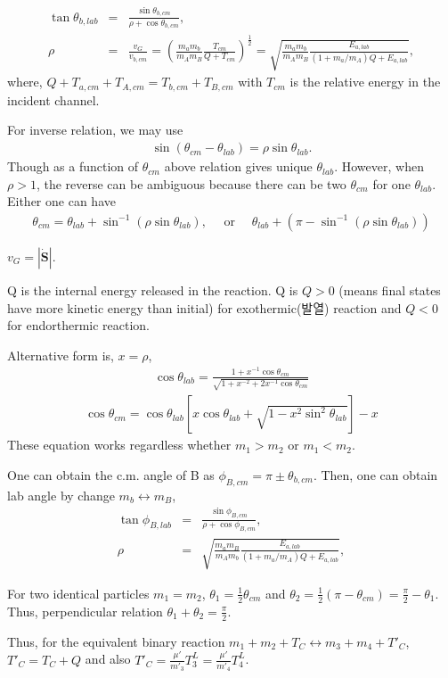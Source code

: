 \documentclass[10pt]{book}
\def\bm{\boldsymbol}
\newcommand{\bea}{\begin{eqnarray}}
\newcommand{\eea}{\end{eqnarray}}
\newcommand{\no}{\nonumber \\}
\begin{document}
\begin{itemize}
{	
}
  
\bea
\tan\theta_{b,lab}&=&\frac{\sin\theta_{b,cm}}{\rho+\cos\theta_{b,cm}},\no
\rho&=&\frac{v_G}{v_{b,cm}}=\left(\frac{m_a m_b}{m_A m_B}\frac{T_{cm}}{Q+T_{cm}}\right)^{\frac{1}{2}}
  = \sqrt{\frac{m_a m_b}{m_A m_B}\frac{E_{a,lab}}{(1+m_a/m_A)Q+E_{a,lab} }},
\eea
where, $Q+T_{a,cm}+T_{A,cm}=T_{b,cm}+T_{B,cm}$ 
with $T_{cm}$ is the relative energy in the incident channel.

For inverse relation, we may use 
\bea 
\sin(\theta_{cm}-\theta_{lab})=\rho\sin\theta_{lab}.
\eea 
Though as a function of $\theta_{cm}$ above relation gives unique $\theta_{lab}$. 
However, when $\rho> 1$, the reverse can be ambiguous
because there can be two $\theta_{cm}$ for one $\theta_{lab}$.   
Either one can have 
\bea 
\theta_{cm} = \theta_{lab}+\sin^{-1}(\rho \sin\theta_{lab}), \quad \mbox{ or } \quad 
              \theta_{lab}+(\pi-\sin^{-1}(\rho \sin\theta_{lab}))
\eea 


$v_G=|\dot{\bm S}|$.


Q is the internal energy released in the reaction.
Q is $Q>0$
(means final states have more kinetic energy than initial) 
for exothermic(발열) reaction and
$Q<0$ for endorthermic reaction.


Alternative form is, $x=\rho$,
\bea 
\cos\theta_{lab} = \frac{1+x^{-1}\cos\theta_{cm}}{\sqrt{1+x^{-2}+2 x^{-1}\cos\theta_{cm}}}
\eea  
\bea 
\cos\theta_{cm} =\cos\theta_{lab}\left[ x\cos\theta_{lab}+\sqrt{1-x^2\sin^2\theta_{lab}}\right] -x  
\eea 
These equation works regardless whether $m_1 > m_2$ or $m_1 < m_2$. 

One can obtain the c.m. angle of B as $\phi_{B,cm}=\pi\pm \theta_{b,cm}$.
Then, one can obtain lab angle by change $m_b\leftrightarrow m_B$,
\bea 
\tan\phi_{B,lab}&=&\frac{\sin\phi_{B,cm}}{\rho+\cos\phi_{B,cm}},\no
\rho&=&\sqrt{\frac{m_a m_B}{m_A m_b}\frac{E_{a,lab}}{(1+m_a/m_A)Q+E_{a,lab} }},
\eea 

For two identical particles $m_1=m_2$, 
$\theta_1=\frac{1}{2}\theta_{cm}$ and $\theta_2=\frac{1}{2}(\pi-\theta_{cm})=\frac{\pi}{2}-\theta_1$. 
Thus, perpendicular relation $\theta_1+\theta_2=\frac{\pi}{2}$. 

Thus, for the equivalent binary reaction $m_1+m_2+T_C\leftrightarrow m_3+m_4+T'_C$,
$T'_{C}=T_C+Q$ and also $T'_C=\frac{\mu'}{m'_3}T_3^L=\frac{\mu'}{m'_4}T_4^L$.


\end{itemize}
\end{document}
